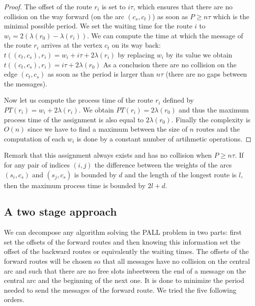 \documentclass[a4paper,10pt]{article}
\begin{document}
{\begin{proof}
        The offset of the route $r_i$ is set to $i\tau$, which ensures that there are no collision on the way forward (on the arc $(c_s,c_t)$) as soon as $P \geq n\tau$ which is the minimal possible period. We set the waiting time for the route $i$ to $w_i = 2(\lambda(r_{0}) - \lambda(r_{i}))$. We can compute the time at which the message of the route $r_i$ arrives at the vertex $c_t$ on its way back: $t((c_t,c_s),r_i) = w_i + i\tau + 2\lambda(r_{i})$
        by replacing $w_i$ by its value we obtain $t((c_t,c_s),r_i) =  i\tau + 2\lambda(r_{0})$
        As a conclusion there are no collision on the edge $(c_t,c_s)$ as soon as the 
        period is larger than $n\tau$ (there are no gaps between the messages).
        
        Now let us compute the process time of the route $r_i$ defined by $PT(r_i) = w_i + 2\lambda(r_{i}) $. We obtain $PT(r_i) = 2\lambda(r_{0})$ and thus the maximum process time of the assignment is also equal to $2\lambda(r_0)$.
	Finally the complexity is $O(n)$ since we have to find a maximum between the size of $n$ routes and the computation of each $w_i$ is done by a constant number of artihmetic operations.
     \end{proof}
     
     Remark that this assignment always exists and has no collision when $P \geq n\tau$. 
     If for any pair of indices $(i,j)$ the difference between the weights of the arcs $(s_i,c_s)$ and $(s_j,c_s)$ is bounded 
     by $d$ and the length of the longest route is $l$, then the maximum process time is bounded by  $2l + d$.

     
     \subsection{A two stage approach}
     
     We can decompose any algorithm solving the PALL problem in two parts: first set the offsets of the forward routes and then knowing this information set the offset of the backward routes or equivalently the waiting times.  
     The offsets of the forward routes will be chosen so that all messages have no collision on the central arc and such that there are no free slots inbeetween the end of a message on the central arc and the beginning of the next one. 
     It is done to minimize the period needed to send the messages of the forward route.
     We tried the five following orders. 
	\begin{itemize}
	 

\end{itemize}}
\end{document}
